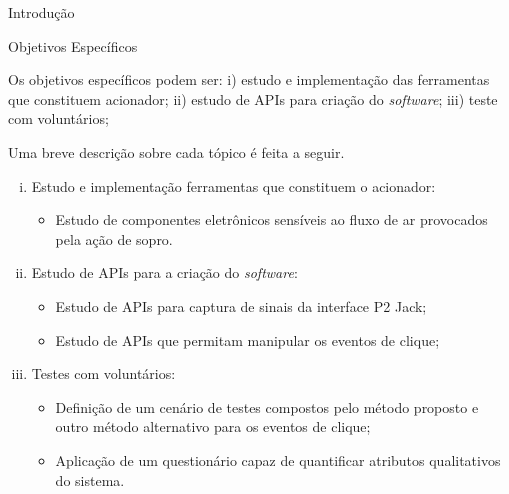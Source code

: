 \begin{chapter}{Introdução}

\begin{subsection}{Objetivos Específicos}

Os objetivos específicos podem ser:
i) estudo e implementação das ferramentas que constituem acionador;
ii) estudo de APIs para criação do \textit{software};
iii) teste com voluntários;

Uma breve descrição sobre cada tópico é feita a seguir.

\begin{enumerate}[i)]

\setlength\itemsep{-.2cm}
	\item Estudo e implementação ferramentas que constituem o acionador: \vspace{-.2cm}
	\begin{itemize}
		\item Estudo de componentes eletrônicos sensíveis ao fluxo de ar
provocados pela ação de sopro.
	\end{itemize}

	\item Estudo de APIs para a criação do \textit{software}: \vspace{-.2cm}
	\begin{itemize}
		\item Estudo de APIs para captura de sinais da interface P2 Jack;
		\item Estudo de APIs que permitam manipular os eventos de clique;
	\end{itemize}

	\item Testes com voluntários: \vspace{-.2cm}
	\begin{itemize}
		\item Definição de um cenário de testes compostos pelo método proposto 
		e outro método alternativo para os eventos de clique;
		\item Aplicação de um questionário capaz de quantificar atributos 
		qualitativos do sistema.
	\end{itemize}


\end{enumerate}


\end{subsection}
\end{chapter}
